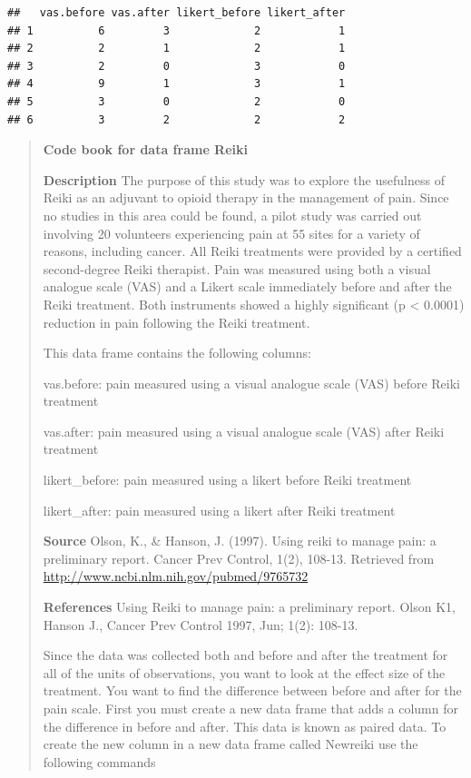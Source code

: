 \documentclass[]{book}
\begin{document}
\begin{verbatim}
##   vas.before vas.after likert_before likert_after
## 1          6         3             2            1
## 2          2         1             2            1
## 3          2         0             3            0
## 4          9         1             3            1
## 5          3         0             2            0
## 6          3         2             2            2
\end{verbatim}

\begin{quote}
\textbf{Code book for data frame Reiki}

\textbf{Description}
The purpose of this study was to explore the usefulness of Reiki as an adjuvant to opioid therapy in the management of pain. Since no studies in this area could be found, a pilot study was carried out involving 20 volunteers experiencing pain at 55 sites for a variety of reasons, including cancer. All Reiki treatments were provided by a certified second-degree Reiki therapist. Pain was measured using both a visual analogue scale (VAS) and a Likert scale immediately before and after the Reiki treatment. Both instruments showed a highly significant (p \textless{} 0.0001) reduction in pain following the Reiki treatment.

This data frame contains the following columns:

vas.before: pain measured using a visual analogue scale (VAS) before Reiki treatment

vas.after: pain measured using a visual analogue scale (VAS) after Reiki treatment

likert\_before: pain measured using a likert before Reiki treatment

likert\_after: pain measured using a likert after Reiki treatment

\textbf{Source}
Olson, K., \& Hanson, J. (1997). Using reiki to manage pain: a preliminary report. Cancer Prev Control, 1(2), 108-13. Retrieved from \url{http://www.ncbi.nlm.nih.gov/pubmed/9765732}

\textbf{References}
Using Reiki to manage pain: a preliminary report. Olson K1, Hanson J., Cancer Prev Control 1997, Jun; 1(2): 108-13.

Since the data was collected both and before and after the treatment for all of the units of observations, you want to look at the effect size of the treatment. You want to find the difference between before and after for the pain scale. First you must create a new data frame that adds a column for the difference in before and after. This data is known as paired data. To create the new column in a new data frame called Newreiki use the following commands
\end{quote}
\end{document}
